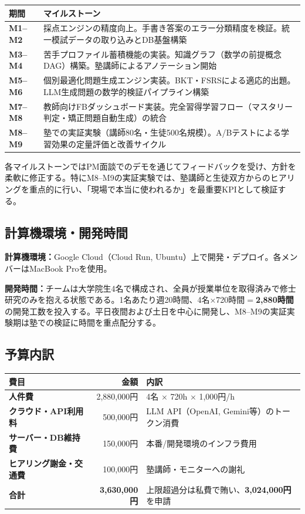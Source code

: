 \documentclass[paper=a4,fontsize=10.5bp,jafontsize=10.5bp,twocolumn]{jlreq}
\begin{document}
\begin{footnotesize}\noindent
\begin{tabularx}{\linewidth}{>{\bfseries}l X}
\toprule
期間 & マイルストーン \\
\midrule
M1--M2 & 採点エンジンの精度向上。手書き答案のエラー分類精度を検証。統一模試データの取り込みとDB基盤構築 \\
M3--M4 & 苦手プロファイル蓄積機能の実装。知識グラフ（数学の前提概念DAG）構築。塾講師によるアノテーション開始 \\
M5--M6 & 個別最適化問題生成エンジン実装。BKT・FSRSによる適応的出題。LLM生成問題の数学的検証パイプライン構築 \\
M7--M8 & 教師向けFBダッシュボード実装。完全習得学習フロー（マスタリー判定・矯正問題自動生成）の統合 \\
M8--M9 & 塾での実証実験（講師80名・生徒500名規模）。A/Bテストによる学習効果の定量評価と改善サイクル \\
\bottomrule
\end{tabularx}
\end{footnotesize}


\noindent
各マイルストーンではPM面談でのデモを通じてフィードバックを受け、方針を柔軟に修正する。特にM8--M9の実証実験では、塾講師と生徒双方からのヒアリングを重点的に行い、「現場で本当に使われるか」を最重要KPIとして検証する。

\subsection{計算機環境・開発時間}

\noindent\textbf{計算機環境：}Google Cloud（Cloud Run, Ubuntu）上で開発・デプロイ。各メンバーはMacBook Proを使用。

\noindent\textbf{開発時間：}チームは大学院生4名で構成され、全員が授業単位を取得済みで修士研究のみを抱える状態である。1名あたり週20時間、4名$\times$720時間$=$\textbf{2,880時間}の開発工数を投入する。平日夜間および土日を中心に開発し、M8--M9の実証実験期は塾での検証に時間を重点配分する。

\subsection{予算内訳}


\begin{footnotesize}\noindent
\begin{tabularx}{\linewidth}{>{\bfseries}l r X}
\toprule
費目 & 金額 & 内訳 \\
\midrule
人件費 & 2,880,000円 & 4名 $\times$ 720h $\times$ 1,000円/h \\
クラウド・API利用料 & 500,000円 & LLM API（OpenAI, Gemini等）のトークン消費 \\
サーバー・DB維持費 & 150,000円 & 本番/開発環境のインフラ費用 \\
ヒアリング謝金・交通費 & 100,000円 & 塾講師・モニターへの謝礼 \\
\midrule
\textbf{合計} & \textbf{3,630,000円} & 上限超過分は私費で賄い、\textbf{3,024,000円}を申請 \\
\bottomrule
\end{tabularx}
\end{footnotesize}
\end{document}
